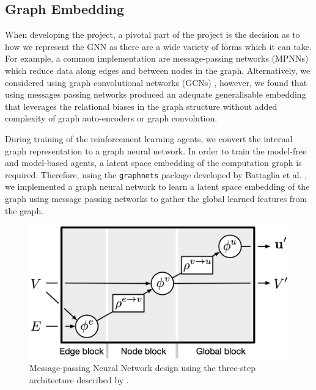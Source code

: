 \subsection{Graph Embedding}
\label{sec:design:subsec:embed}

When developing the project, a pivotal part of the project is the decision as to how we represent the GNN as there are a wide variety of forms which it can take. For example, a common implementation are message-passing networks (MPNNs) \cite{gilmer2017neural} which reduce data along edges and between nodes in the graph. Alternatively, we considered using graph convolutional networks (GCNs) \cite{kipf2016semi}, however, we found that using messages passing networks produced an adequate generalisable embedding that leverages the relational biases in the graph structure without added complexity of graph auto-encoders or graph convolution.


During training of the reinforcement learning agents, we convert the internal graph representation to a graph neural network. In order to train the model-free and model-based agents, a latent space embedding of the computation graph is required. Therefore, using the \texttt{graph\textunderscore nets} package developed by Battaglia et al. \cite{battaglia2018relational}, we implemented a graph neural network to learn a latent space embedding of the graph using message passing networks to gather the global learned features from the graph.

\begin{figure}[ht]
  \centering
  \includegraphics[width=0.75\columnwidth]{sections/4rlopt/images/mpnn.png}
  \caption[Message-passing neural network]{Message-passing Neural Network design using the three-step architecture described by \citet{battaglia2018relational}.}
  \label{fig:rlopt:mpgnn}
\end{figure}

